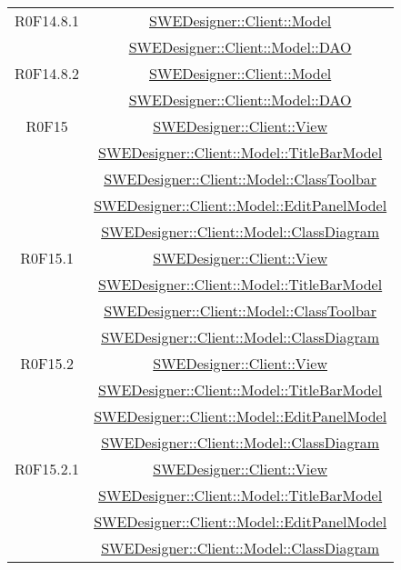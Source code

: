 \documentclass[../SpecificaTecnica.tex]{subfiles}
\begin{document}
\begin{longtable}{|c|c|}
		R0F14.8.1 & \hyperlink{SWEDesigner::Client::Model}{SWEDesigner::Client::Model}\\& \hyperlink{SWEDesigner::Client::Model::DAO}{SWEDesigner::Client::Model::DAO}\\\hline
		R0F14.8.2 & \hyperlink{SWEDesigner::Client::Model}{SWEDesigner::Client::Model}\\& \hyperlink{SWEDesigner::Client::Model::DAO}{SWEDesigner::Client::Model::DAO}\\\hline
		R0F15 & \hyperlink{SWEDesigner::Client::View}{SWEDesigner::Client::View}\\& \hyperlink{SWEDesigner::Client::Model::TitleBarModel}{SWEDesigner::Client::Model::TitleBarModel}\\& \hyperlink{SWEDesigner::Client::Model::ClassToolbar}{SWEDesigner::Client::Model::ClassToolbar}\\& \hyperlink{SWEDesigner::Client::Model::EditPanelModel}{SWEDesigner::Client::Model::EditPanelModel}\\& \hyperlink{SWEDesigner::Client::Model::ClassDiagram}{SWEDesigner::Client::Model::ClassDiagram}\\\hline
		R0F15.1 & \hyperlink{SWEDesigner::Client::View}{SWEDesigner::Client::View}\\& \hyperlink{SWEDesigner::Client::Model::TitleBarModel}{SWEDesigner::Client::Model::TitleBarModel}\\& \hyperlink{SWEDesigner::Client::Model::ClassToolbar}{SWEDesigner::Client::Model::ClassToolbar}\\& \hyperlink{SWEDesigner::Client::Model::ClassDiagram}{SWEDesigner::Client::Model::ClassDiagram}\\\hline
		R0F15.2 & \hyperlink{SWEDesigner::Client::View}{SWEDesigner::Client::View}\\& \hyperlink{SWEDesigner::Client::Model::TitleBarModel}{SWEDesigner::Client::Model::TitleBarModel}\\& \hyperlink{SWEDesigner::Client::Model::EditPanelModel}{SWEDesigner::Client::Model::EditPanelModel}\\& \hyperlink{SWEDesigner::Client::Model::ClassDiagram}{SWEDesigner::Client::Model::ClassDiagram}\\\hline
		R0F15.2.1 & \hyperlink{SWEDesigner::Client::View}{SWEDesigner::Client::View}\\& \hyperlink{SWEDesigner::Client::Model::TitleBarModel}{SWEDesigner::Client::Model::TitleBarModel}\\& \hyperlink{SWEDesigner::Client::Model::EditPanelModel}{SWEDesigner::Client::Model::EditPanelModel}\\& \hyperlink{SWEDesigner::Client::Model::ClassDiagram}{SWEDesigner::Client::Model::ClassDiagram}\\\hline

\end{longtable}
\end{document}
